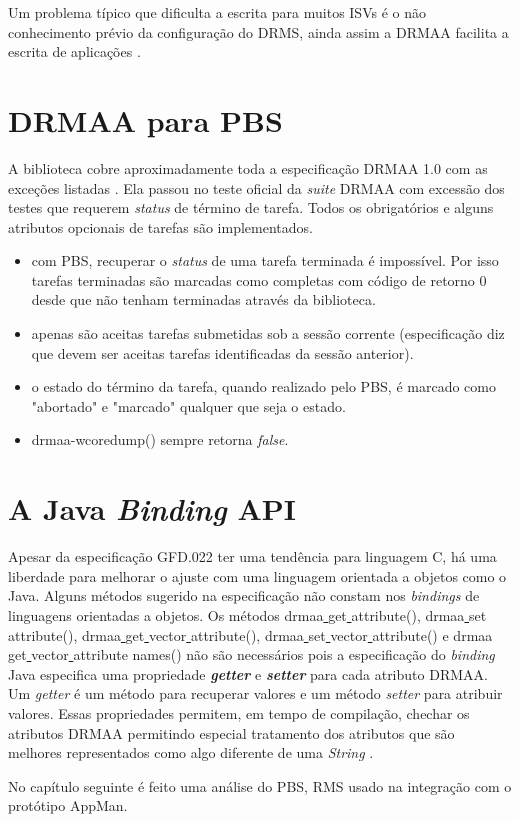 Um problema típico que dificulta a escrita para muitos ISVs é o não conhecimento prévio da configuração do DRMS, ainda assim a DRMAA facilita a escrita de aplicações \cite{Rajic2002}.

\section{DRMAA para PBS}

A biblioteca cobre aproximadamente toda a especificação DRMAA 1.0 com as exceções listadas \cite{drmaa_pbs}. Ela passou no teste oficial da \emph{suite} DRMAA com excessão dos testes que requerem \emph{status} de término de tarefa. Todos os obrigatórios e alguns atributos opcionais de tarefas são implementados.

\begin{itemize}
	\item com PBS, recuperar o \emph{status} de uma tarefa terminada é impossível. Por isso tarefas terminadas são marcadas como completas com código de retorno 0 desde que não tenham terminadas através da biblioteca.
	\item apenas são aceitas tarefas submetidas sob a sessão corrente (especificação diz que devem ser aceitas tarefas identificadas da sessão anterior).
	\item o estado do término da tarefa, quando realizado pelo PBS, é marcado como "abortado"  e  "marcado" qualquer que seja o estado.
	\item drmaa-wcoredump() sempre retorna \emph{false}.
\end{itemize}

\section{A Java \emph{Binding} API}

Apesar da especificação GFD.022 ter uma tendência para linguagem C, há uma liberdade para melhorar o ajuste com uma linguagem orientada a objetos como o Java. Alguns métodos sugerido na especificação não constam nos \emph{bindings} de linguagens orientadas a objetos. Os métodos drmaa\underline{ }get\underline{ }attribute(), drmaa\underline{ }set\underline{ }attribute(), drmaa\underline{ }get\underline{ }vector\underline{ }attribute(), drmaa\underline{ }set\underline{ }vector\underline{ }attribute() e drmaa\underline{ }get\underline{ }vector\underline{ } attribute \underline{ }names() não são necessários pois a especificação do \emph{binding} Java especifica uma propriedade \emph{\textbf{getter}} e \emph{\textbf{setter}} para cada atributo DRMAA. Um \emph{getter} é um método para recuperar valores e um método \emph{setter} para atribuir valores. Essas propriedades permitem, em tempo de compilação, chechar os atributos DRMAA permitindo especial tratamento dos atributos que são melhores representados como algo diferente de uma \emph{String} \cite{Templeton2003}.

No capítulo seguinte é feito uma análise do PBS, RMS usado na integração com o protótipo AppMan.